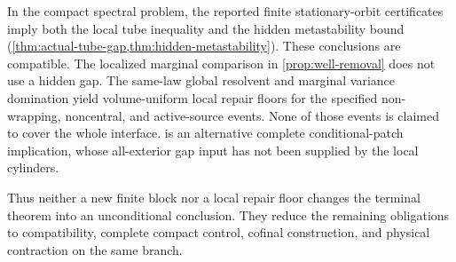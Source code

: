 \documentclass[11pt,oneside,openany]{book}
\theoremstyle{definition}
\theoremstyle{remark}
\begin{document}
In the compact spectral problem, the reported finite stationary-orbit
certificates imply both the local tube inequality and the hidden
metastability bound (\cref{thm:actual-tube-gap,thm:hidden-metastability}).
These conclusions are compatible. The localized marginal comparison
in \cref{prop:well-removal} does not use a hidden gap. The same-law
global resolvent and marginal variance domination yield volume-uniform
local repair floors for the specified non-wrapping, noncentral, and
active-source events. None of those events is claimed to cover the
whole interface.  is an alternative complete
conditional-patch implication, whose all-exterior gap input has not
been supplied by the local cylinders.

Thus neither a new finite block nor a local repair floor changes the
terminal theorem into an unconditional conclusion. They reduce the
remaining obligations to compatibility, complete compact control,
cofinal construction, and physical contraction on the same branch.
\end{document}

